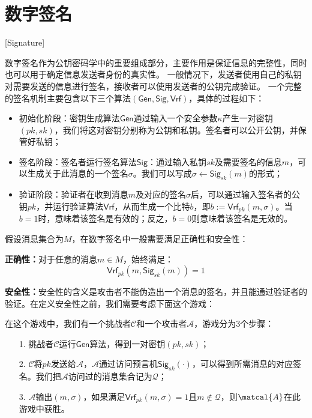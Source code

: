 \section{数字签名}[Signature]

数字签名作为公钥密码学中的重要组成部分，主要作用是保证信息的完整性，同时也可以用于确定信息发送者身份的真实性。
一般情况下，发送者使用自己的私钥对需要发送的信息进行签名，接收者可以使用发送者的公钥完成验证。
一个完整的签名机制主要包含以下三个算法$(\mathsf{Gen},\mathsf{Sig},\mathsf{Vrf})$，具体的过程如下：

\begin{itemize}
  \item 初始化阶段：密钥生成算法$\mathsf{Gen}$通过输入一个安全参数$\kappa$产生一对密钥$(pk,sk)$，我们将这对密钥分别称为公钥和私钥。签名者可以公开公钥，并保管好私钥；
  \item 签名阶段：签名者运行签名算法$\mathsf{Sig}$：通过输入私钥$sk$及需要签名的信息$m$，可以生成关于此消息的一个签名$\sigma$。我们可以写成$\sigma\leftarrow \mathsf{Sig}_{sk}(m)$的形式；
  \item 验证阶段：验证者在收到消息$m$及对应的签名$\sigma$后，可以通过输入签名者的公钥$pk$，并运行验证算法$\mathsf{Vrf}$，从而生成一个比特$b$，即$b:= \mathsf{Vrf}_{pk}(m,\sigma)$。当$b=1$时，意味着该签名是有效的；反之，$b=0$则意味着该签名是无效的。
\end{itemize}

假设消息集合为$M$，在数字签名中一般需要满足正确性和安全性：

\textbf{正确性：}对于任意的消息$m\in M$，始终满足：
\begin{equation}
\mathsf{Vrf}_{pk}(m,\mathsf{Sig}_{sk}(m))=1
\end{equation}

\textbf{安全性：}安全性的含义是攻击者不能伪造出一个消息的签名，并且能通过验证者的验证。在定义安全性之前，我们需要考虑下面这个游戏：

在这个游戏中，我们有一个挑战者$\mathcal{C}$和一个攻击者$\mathcal{A}$，游戏分为3个步骤：
\begin{itemize}
  \item[1.] 挑战者$\mathcal{C}$运行$\mathsf{Gen}$算法，得到一对密钥$(pk,sk)$；
  \item[2.] $\mathcal{C}$将$pk$发送给$\mathcal{A}$，$\mathcal{A}$通过访问预言机$\mathsf{Sig}_{sk}(\cdot)$，可以得到所需消息的对应签名。我们把$\mathcal{A}$访问过的消息集合记为$\mathcal{Q}$；
  \item[3.] $\mathcal{A}$输出$(m,\sigma)$，如果满足$\mathsf{Vrf}_{pk}(m,\sigma)=1$且$m\notin \mathcal{Q}$，则$\matcal{A}$在此游戏中获胜。
\end{itemize}

